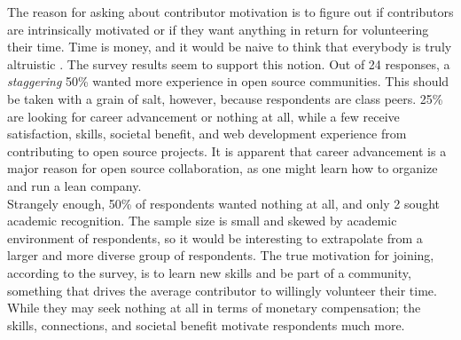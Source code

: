 The reason for asking about contributor motivation is to figure out if contributors are intrinsically motivated or if they want anything in return for volunteering their time. Time is money, and it would be naive to think that everybody is truly altruistic \cite{Algon2013cooperation}. The survey results seem to support this notion. Out of 24 responses, a {\it staggering}  50\% wanted more experience in open source communities. This should be taken with a grain of salt, however, because respondents are class peers. 25\% are looking for career advancement or nothing at all, while a few receive satisfaction, skills, societal benefit, and web development experience from contributing to open source projects. It is apparent that career advancement is a major reason for open source collaboration, as one might learn how to organize and run a lean company.\\

\noindent Strangely enough, 50\% of respondents wanted nothing at all, and only 2 sought academic recognition. The sample size is small and skewed by academic environment of respondents, so it would be interesting to extrapolate from a larger and more diverse group of respondents. The true motivation for joining, according to the survey, is to learn new skills and be part of a community, something that drives the average contributor to willingly volunteer their time. While they may seek nothing at all in terms of monetary compensation; the skills, connections, and societal benefit motivate respondents much more.
